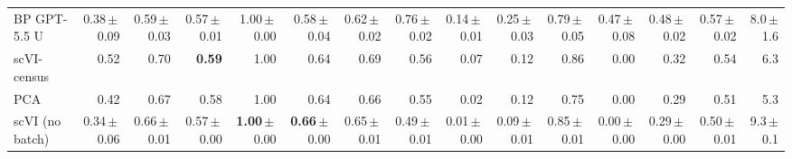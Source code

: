 \begin{table}
\begin{tabular}{lrrrrrrrrrrrrrr}
BP GPT-5.5 U & 0.38\,$\pm$\,0.09 & 0.59\,$\pm$\,0.03 & 0.57\,$\pm$\,0.01 & 1.00\,$\pm$\,0.00 & 0.58\,$\pm$\,0.04 & 0.62\,$\pm$\,0.02 & 0.76\,$\pm$\,0.02 & 0.14\,$\pm$\,0.01 & 0.25\,$\pm$\,0.03 & 0.79\,$\pm$\,0.05 & 0.47\,$\pm$\,0.08 & 0.48\,$\pm$\,0.02 & 0.57\,$\pm$\,0.02 & 8.0\,$\pm$\,1.6 \\
scVI-census & 0.52 & 0.70 & \textbf{0.59} & 1.00 & 0.64 & 0.69 & 0.56 & 0.07 & 0.12 & 0.86 & 0.00 & 0.32 & 0.54 & 6.3 \\
PCA & 0.42 & 0.67 & 0.58 & 1.00 & 0.64 & 0.66 & 0.55 & 0.02 & 0.12 & 0.75 & 0.00 & 0.29 & 0.51 & 5.3 \\
scVI (no batch) & 0.34\,$\pm$\,0.06 & 0.66\,$\pm$\,0.01 & 0.57\,$\pm$\,0.00 & \textbf{1.00}\,$\pm$\,0.00 & \textbf{0.66}\,$\pm$\,0.00 & 0.65\,$\pm$\,0.01 & 0.49\,$\pm$\,0.01 & 0.01\,$\pm$\,0.00 & 0.09\,$\pm$\,0.01 & 0.85\,$\pm$\,0.01 & 0.00\,$\pm$\,0.00 & 0.29\,$\pm$\,0.00 & 0.50\,$\pm$\,0.01 & 9.3\,$\pm$\,0.1 \\
\bottomrule
\end{tabular}
\end{table}
